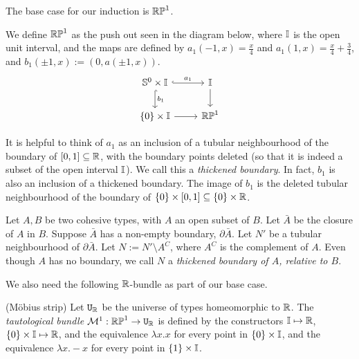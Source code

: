 \documentclass{amsart}
\begin{document}
The base case for our induction is $\mathbb{RP}^1$.

\begin{definition}
We define $\mathbb{RP}^1$ as the push out seen in the diagram below, where $\mathbb{I}$ is the open unit interval, and the maps are defined by $a_1(-1,x) = \frac{x}{4}$ and $a_1(1,x)= \frac{x}{4} + \frac{3}{4}$, and $b_1 (\pm 1, x) := (0, a(\pm1, x))$.\\
\[\begin{tikzcd}
\set{S}^0 \times \set{I} \arrow[r, hook, "a_1"] \arrow[d, hook, "b_1" ] & \set{I} \arrow[d]\\
\{0 \} \times \set{I} \arrow[r] & \set{RP}^1
\end{tikzcd}
\]
\end{definition}

It is helpful to think of $a_1$ as an inclusion of a tubular neighbourhood of the boundary of $[0,1] \subseteq \mathbb{R}$, with the boundary points deleted (so that it is indeed a subset of the open interval $\mathbb{I}$). We call this a \emph{thickened boundary}. In fact, $b_1$ is also an inclusion of a thickened boundary. The image of $b_1$ is the deleted tubular neighbourhood of the boundary of $\{0\} \times [0,1] \subseteq \{0\} \times \mathbb{R}$.

\begin{definition}
Let $A, B$ be two cohesive types, with $A$ an open subset of $B$. Let $\bar{A}$ be the closure of $A$ in $B$. Suppose $\bar{A}$ has a non-empty boundary, $\partial \bar{A}$. Let $N'$ be a tubular neighbourhood of $\partial\bar{A}$. Let $N := N' \setminus A^C$, where $A^C$ is the complement of $A$. Even though $A$ has no boundary, we call $N$ a \emph{thickened boundary of $A$, relative to $B$}.
\end{definition}

We also need the following $\mathbb{R}$-bundle as part of our base case. 
\begin{definition}(M\"{o}bius strip)
Let $\mathtt{U}_{\mathbb{R}}$ be the universe of types homeomorphic to $\mathbb{R}$. The \emph{tautological bundle} $\mathcal{M}^1: \mathbb{RP}^1 \rightarrow \mathtt{U}_{\mathbb{R}}$ is defined by the constructors $\mathbb{I} \mapsto \mathbb{R}$, $\{0 \} \times \mathbb{I} \mapsto \mathbb{R}$, and the equivalence $\lambda x. x$ for every point in $\{0\} \times \mathbb{I}$, and the equivalence $\lambda x. -x$ for every point in $\{1\} \times \mathbb{I}$.
\end{definition}
\end{document}

